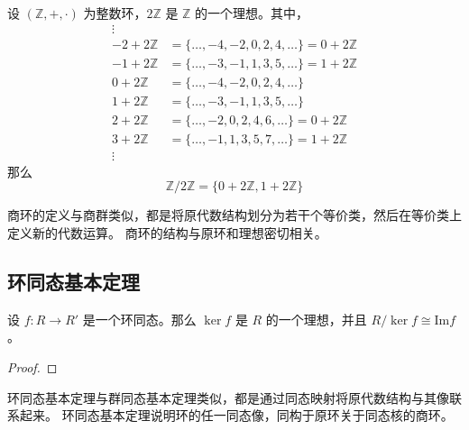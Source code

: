 \begin{example}
    设 $(\mathbb{Z},+,\cdot)$ 为整数环，$2\mathbb{Z} $ 是 $\mathbb{Z}$ 的一个理想。其中，
    \begin{align*}
        \vdots  \\
        -2 + 2\mathbb{Z} &= \{\ldots,-4,-2,0,2,4,\ldots\} = 0 + 2\mathbb{Z} \\
        -1 + 2\mathbb{Z} &= \{\ldots,-3,-1,1,3,5,\ldots\} = 1 + 2\mathbb{Z} \\
        0 + 2\mathbb{Z} &= \{\ldots,-4,-2,0,2,4,\ldots\} \\
        1 + 2\mathbb{Z} &= \{\ldots,-3,-1,1,3,5,\ldots\} \\
        2 + 2\mathbb{Z} &= \{\ldots,-2,0,2,4,6,\ldots\} = 0 + 2\mathbb{Z} \\
        3 + 2\mathbb{Z} &= \{\ldots,-1,1,3,5,7,\ldots\} = 1 + 2\mathbb{Z} \\
        \vdots 
    \end{align*}
    那么
    \[
        \mathbb{Z}/2\mathbb{Z} = \{0+2\mathbb{Z}, 1+2\mathbb{Z}\}
    \]
\end{example}

\begin{note}
    商环的定义与商群类似，都是将原代数结构划分为若干个等价类，然后在等价类上定义新的代数运算。
    商环的结构与原环和理想密切相关。
\end{note}
\vspace{1em}

\subsection{环同态基本定理}

\begin{theorem}
    设 $f:R\to R'$ 是一个环同态。那么 $\ker f$ 是 $R$ 的一个理想，并且 $R/\ker f \cong \mathrm{Im} f$。
    \label{thm:first_isomorphism_theorem_for_rings}
\end{theorem}
\begin{proof}
    
\end{proof}

\begin{note}
    环同态基本定理与群同态基本定理类似，都是通过同态映射将原代数结构与其像联系起来。
    环同态基本定理说明环的任一同态像，同构于原环关于同态核的商环。
\end{note}

\vspace{1em}

